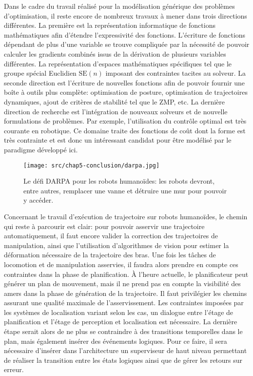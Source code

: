 Dans le cadre du travail réalisé pour la modélisation générique des
problèmes d'optimisation, il reste encore de nombreux travaux à mener
dans trois directions différentes. La première est la représentation
informatique de fonctions mathématiques afin d'étendre l'expressivité
des fonctions. L'écriture de fonctions dépendant de plus d'une
variable se trouve compliquée par la nécessité de pouvoir calculer les
gradients combinés issus de la dérivation de plusieurs variables
différentes. La représentation d'espaces mathématiques spécifiques tel
que le groupe spécial Euclidien $\text{SE}(n)$ imposant des
contraintes tacites au solveur. La seconde direction est l'écriture de
nouvelles fonctions afin de pouvoir fournir une boîte à outils plus
complète: optimisation de posture, optimisation de trajectoires
dynamiques, ajout de critères de stabilité tel que le ZMP, etc. La
dernière direction de recherche est l'intégration de nouveaux solveurs
et de nouvelle formulations de problèmes. Par exemple, l'utilisation
du contrôle optimal est très courante en robotique. Ce domaine traite
des fonctions de coût dont la forme est très contrainte et est donc un
intéressant candidat pour être modélisé par le paradigme développé
ici.


\begin{figure}[htbp]
  \begin{center}
    \texttt{[image: src/chap5-conclusion/darpa.jpg]}
  \end{center}
  \caption{Le défi DARPA pour les robots humanoïdes: les robots
    devront, entre autres, remplacer une vanne et détruire une mur pour
    pouvoir y accéder. \label{fig:darpachallenge}}
\end{figure}


Concernant le travail d'exécution de trajectoire sur robots humanoïdes,
le chemin qui reste à parcourir est clair: pour pouvoir asservir une
trajectoire automatiquement, il faut encore valider la correction des
trajectoires de manipulation, ainsi que l'utilisation d'algorithmes de
vision pour estimer la déformation nécessaire de la trajectoire des
bras. Une fois les tâches de locomotion et de manipulation asservies,
il faudra alors prendre en compte ces contraintes dans la phase de
planification. À l'heure actuelle, le planificateur peut générer un
plan de mouvement, mais il ne prend pas en compte la visibilité des
amers dans la phase de génération de la trajectoire. Il faut
privilégier les chemins assurant une qualité maximale de
l'asservissement. Les contraintes imposées par les systèmes de
localisation variant selon les cas, un dialogue entre l'étage de
planification et l'étage de perception et localisation est nécessaire.
La dernière étape serait alors de ne plus se contraindre à des
transitions temporelles dans le plan, mais également insérer des
événements logiques. Pour ce faire, il sera nécessaire d'insérer dans
l'architecture un superviseur de haut niveau permettant de réaliser la
transition entre les états logiques ainsi que de gérer les retours sur
erreur.


